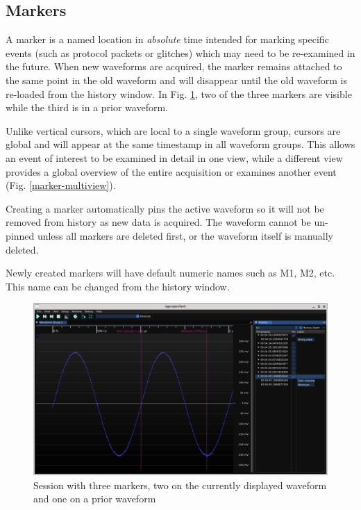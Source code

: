 \subsection{Markers}
\label{sec:markers}

A marker is a named location in \emph{absolute} time intended for marking specific events (such as protocol packets or
glitches) which may need to be re-examined in the future. When new waveforms are acquired, the marker remains attached
to the same point in the old waveform and will disappear until the old waveform is re-loaded from the history window.
In Fig. \ref{markers}, two of the three markers are visible while the third is in a prior waveform.

Unlike vertical cursors, which are local to a single waveform group, cursors are global and will appear at the same
timestamp in all waveform groups. This allows an event of interest to be examined in detail in one view, while a
different view provides a global overview of the entire acquisition or examines another event (Fig.
\ref{marker-multiview}).

Creating a marker automatically pins the active waveform so it will not be removed from history as new data is
acquired. The waveform cannot be un-pinned unless all markers are deleted first, or the waveform itself is manually
deleted.

Newly created markers will have default numeric names such as M1, M2, etc. This name can be changed from the history
window.

\begin{figure}[H]
\centering
\includegraphics[width=13cm]{ng-images/markers.png}
\caption{Session with three markers, two on the currently displayed waveform and one on a prior waveform}
\label{markers}
\end{figure}

